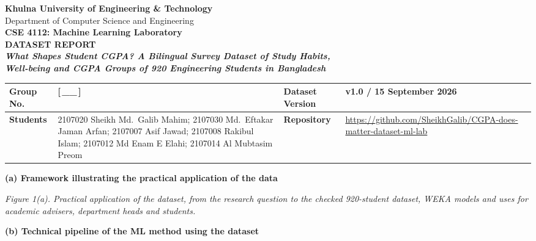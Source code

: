 \documentclass[11pt,a4paper]{article}
\newcommand{\hd}[1]{\textbf{#1}}
\begin{document}
\thispagestyle{fancy}
\begin{center}
\vspace*{0mm}
{\large\bfseries Khulna University of Engineering \& Technology}\\[1pt]
{\large Department of Computer Science and Engineering}\\[1pt]
{\large\bfseries CSE 4112: Machine Learning Laboratory}\\[6mm]
{\LARGE\bfseries DATASET REPORT}\\[3mm]
{\large\bfseries\itshape What Shapes Student CGPA? A Bilingual Survey Dataset of Study Habits,\\ Well-being and CGPA Groups of 920 Engineering Students in Bangladesh}
\end{center}
\vspace{2mm}

{\small
\begin{tabularx}{\linewidth}{|L{21mm}|Y|L{24mm}|L{40mm}|}
\hline
\hd{Group No.} & [\,\_\_\,] & \hd{Dataset Version} & v1.0 / 15 September 2026 \\ \hline
\hd{Students} & 2107020 Sheikh Md.\ Galib Mahim; 2107030 Md.\ Eftakar Jaman Arfan; 2107007 Asif Jawad; 2107008 Rakibul Islam; 2107012 Md Enam E Elahi; 2107014 Al Mubtasim Preom
 & \hd{Repository} & \url{https://github.com/SheikhGalib/CGPA-does-matter-dataset-ml-lab} \\ \hline
\end{tabularx}}

\vspace{3mm}
{\sffamily\bfseries (a) Framework illustrating the practical application of the data}

\vspace{-7mm}
\begin{center}

\end{center}
\vspace{-4mm}
{\small\itshape Figure 1(a). Practical application of the dataset, from the research question to the checked 920-student dataset, WEKA models and uses for academic advisers, department heads and students.}

\vspace{1mm}
{\sffamily\bfseries (b) Technical pipeline of the ML method using the dataset}
\end{document}
